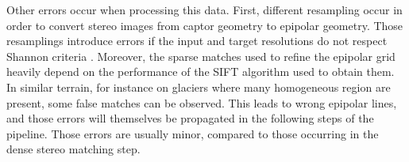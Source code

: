 Other errors occur when processing this data. First, different resampling occur in order to convert stereo images from captor geometry to epipolar geometry. Those resamplings introduce errors if the input and target resolutions do not respect Shannon criteria \cite{delon_small_2007} . Moreover, the sparse matches used to refine the epipolar grid heavily depend on the performance of the SIFT algorithm used to obtain them. In similar terrain, for instance on glaciers where many homogeneous region are present, some false matches can be observed. This leads to wrong epipolar lines, and those errors will themselves be propagated in the following steps of the pipeline. Those errors are usually minor, compared to those occurring in the dense stereo matching step.

